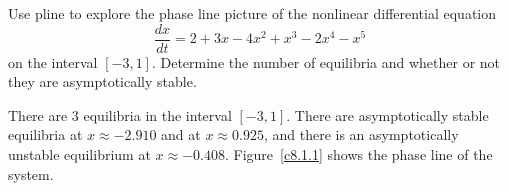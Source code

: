 \documentclass{ximera}
\begin{document}
\begin{exercise} \label{c8.1.1}
Use {\sf pline} to explore the phase line 
picture of the nonlinear differential equation
\[
\frac{dx}{dt} = 2 + 3x - 4x^2 + x^3 - 2x^4 -x^5
\]
on the interval $[-3,1]$.  Determine the number of equilibria
and whether or not they are asymptotically stable.

\begin{solution}

There are 3 equilibria in the interval $[-3,1]$.  There are
asymptotically stable equilibria at $x\approx -2.910$ and at 
$x\approx 0.925$, and there is an asymptotically unstable equilibrium at
$x \approx -0.408$.  Figure~\ref{c8.1.1} shows the phase line
of the system.

\begin{figure}[htb]
                       \centerline{%
                       }
\end{figure}

\end{solution}
\end{exercise}
\end{document}
